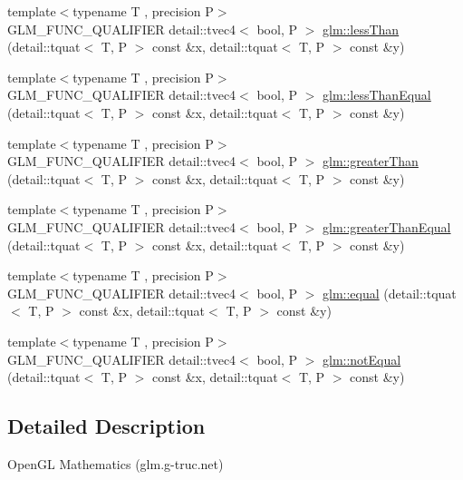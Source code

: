 \begin{DoxyCompactItemize}
\item 
{\footnotesize template$<$typename T , precision P$>$ }\\G\+L\+M\+\_\+\+F\+U\+N\+C\+\_\+\+Q\+U\+A\+L\+I\+F\+I\+ER detail\+::tvec4$<$ bool, P $>$ \hyperlink{group__gtc__quaternion_ga4e4c37b86cecde7e1076c5b5fdb920b9}{glm\+::less\+Than} (detail\+::tquat$<$ T, P $>$ const \&x, detail\+::tquat$<$ T, P $>$ const \&y)
\item 
{\footnotesize template$<$typename T , precision P$>$ }\\G\+L\+M\+\_\+\+F\+U\+N\+C\+\_\+\+Q\+U\+A\+L\+I\+F\+I\+ER detail\+::tvec4$<$ bool, P $>$ \hyperlink{group__gtc__quaternion_ga313fe20896a8cd43c6d08cc88fa18faa}{glm\+::less\+Than\+Equal} (detail\+::tquat$<$ T, P $>$ const \&x, detail\+::tquat$<$ T, P $>$ const \&y)
\item 
{\footnotesize template$<$typename T , precision P$>$ }\\G\+L\+M\+\_\+\+F\+U\+N\+C\+\_\+\+Q\+U\+A\+L\+I\+F\+I\+ER detail\+::tvec4$<$ bool, P $>$ \hyperlink{group__gtc__quaternion_ga63be67bccef0b0ad4e60656223ab3761}{glm\+::greater\+Than} (detail\+::tquat$<$ T, P $>$ const \&x, detail\+::tquat$<$ T, P $>$ const \&y)
\item 
{\footnotesize template$<$typename T , precision P$>$ }\\G\+L\+M\+\_\+\+F\+U\+N\+C\+\_\+\+Q\+U\+A\+L\+I\+F\+I\+ER detail\+::tvec4$<$ bool, P $>$ \hyperlink{group__gtc__quaternion_gac90d5af34a03cd665a349ac30e4cc44c}{glm\+::greater\+Than\+Equal} (detail\+::tquat$<$ T, P $>$ const \&x, detail\+::tquat$<$ T, P $>$ const \&y)
\item 
{\footnotesize template$<$typename T , precision P$>$ }\\G\+L\+M\+\_\+\+F\+U\+N\+C\+\_\+\+Q\+U\+A\+L\+I\+F\+I\+ER detail\+::tvec4$<$ bool, P $>$ \hyperlink{group__gtc__quaternion_ga32ff2cc6fb576639a6237d8d8ed5818b}{glm\+::equal} (detail\+::tquat$<$ T, P $>$ const \&x, detail\+::tquat$<$ T, P $>$ const \&y)
\item 
{\footnotesize template$<$typename T , precision P$>$ }\\G\+L\+M\+\_\+\+F\+U\+N\+C\+\_\+\+Q\+U\+A\+L\+I\+F\+I\+ER detail\+::tvec4$<$ bool, P $>$ \hyperlink{group__gtc__quaternion_gaa3a8cf1aa580e435ca96acafbd7870a5}{glm\+::not\+Equal} (detail\+::tquat$<$ T, P $>$ const \&x, detail\+::tquat$<$ T, P $>$ const \&y)
\end{DoxyCompactItemize}


\subsection{Detailed Description}
Open\+GL Mathematics (glm.\+g-\/truc.\+net)

